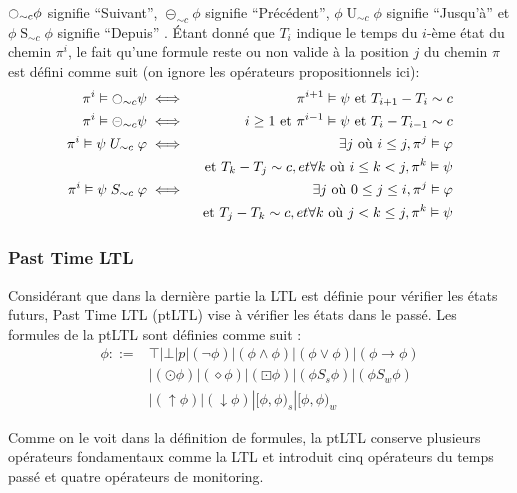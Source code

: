 $\fullmoon_{\sim{}c}\phi$ signifie ``Suivant'', $\circleddash_{\sim{}c}\phi$ signifie ``Précédent'', $\phi \mathrel{U}_{\sim{}c} \phi$ signifie ``Jusqu'à'' et $\phi \mathrel{S}_{\sim{}c} \phi$ signifie ``Depuis'' \citep{chang1994compositional}. Étant donné que $T_i$ indique le temps du $i$-ème état du chemin $\pi^i$, le fait qu'une formule reste ou non valide à la position $j$ du chemin $\pi$ est défini comme suit (on ignore les opérateurs propositionnels ici):
\begin{eqnarray*}
\pi^i \vDash \fullmoon_{\sim{}c}\psi & \iff & \pi^{i+1} \vDash \psi \mbox{ et } T_{i+1} - T_i \sim c \\
\pi^i \vDash \circleddash_{\sim{}c}\psi & \iff & i \geq 1 \mbox{ et } \pi^{i-1} \vDash \psi \mbox{ et } T_i - T_{i-1} \sim c \\
\pi^i \vDash \psi \mathrel{U}_{\sim{}c} \varphi & \iff & \exists j \mbox{ où } i \leq j, \pi^j \vDash \varphi \\ & & \mbox{ et } T_k - T_j \sim c, et \forall k \mbox{ où } i \leq k < j, \pi^k \vDash \psi \\
\pi^i \vDash \psi \mathrel{S}_{\sim{}c} \varphi & \iff & \exists j \mbox{ où } 0 \leq j \leq i, \pi^j \vDash \varphi \\ & & \mbox{ et } T_j - T_k \sim c, et \forall k \mbox{ où } j < k \leq j, \pi^k \vDash \psi \\
\end{eqnarray*}

\subsubsection{Past Time LTL}

Considérant que dans la dernière partie la LTL est définie pour vérifier les états futurs, Past Time LTL (ptLTL) vise à vérifier les états dans le passé. Les formules de la ptLTL sont définies comme suit \citep{havelund2004efficient}:
\begin{align*}
\phi ::= & \top | \bot | p | (\neg\phi) | (\phi \wedge \phi) | (\phi \vee \phi) | (\phi \rightarrow \phi) \\
& | (\odot \phi) | (\diamond \phi) | (\boxdot \phi) | (\phi \mathrel{S_s} \phi) | (\phi \mathrel{S_w} \phi) \\
& | (\uparrow \phi) | (\downarrow \phi) | [\phi, \phi)_s | [\phi, \phi)_w
\end{align*}

Comme on le voit dans la définition de formules, la ptLTL conserve plusieurs opérateurs fondamentaux comme la LTL et introduit cinq opérateurs du temps passé et quatre opérateurs de monitoring.


